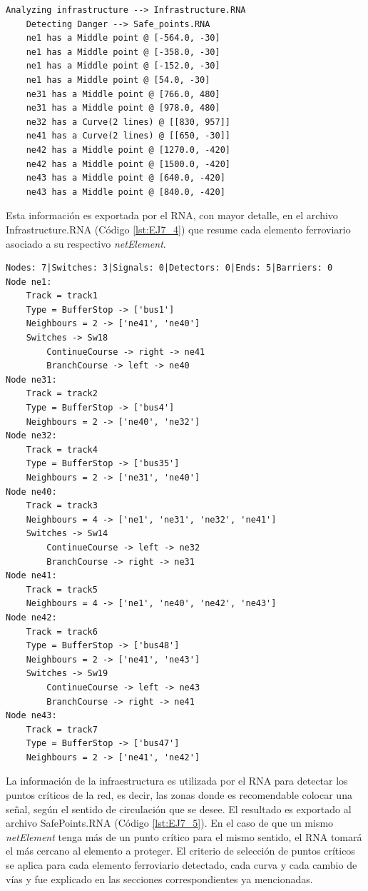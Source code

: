 	\begin{lstlisting}[language = {}, caption = Detección de puntos críticos por parte del RNA , label = {lst:EJ7_2}]
	Analyzing infrastructure --> Infrastructure.RNA
	Detecting Danger --> Safe_points.RNA
	ne1 has a Middle point @ [-564.0, -30]
	ne1 has a Middle point @ [-358.0, -30]
	ne1 has a Middle point @ [-152.0, -30]
	ne1 has a Middle point @ [54.0, -30]
	ne31 has a Middle point @ [766.0, 480]
	ne31 has a Middle point @ [978.0, 480]
	ne32 has a Curve(2 lines) @ [[830, 957]]
	ne41 has a Curve(2 lines) @ [[650, -30]]
	ne42 has a Middle point @ [1270.0, -420]
	ne42 has a Middle point @ [1500.0, -420]
	ne43 has a Middle point @ [640.0, -420]
	ne43 has a Middle point @ [840.0, -420]
	\end{lstlisting}
	
	Esta información es exportada por el RNA, con mayor detalle, en el archivo Infrastructure.RNA (Código \ref{lst:EJ7_4}) que resume cada elemento ferroviario asociado a su respectivo \textit{netElement}.
	
	\begin{lstlisting}[language = {}, caption = Infrastructure.RNA, label = {lst:EJ1_4}]
Nodes: 7|Switches: 3|Signals: 0|Detectors: 0|Ends: 5|Barriers: 0
Node ne1:
	Track = track1
	Type = BufferStop -> ['bus1']
	Neighbours = 2 -> ['ne41', 'ne40']
	Switches -> Sw18
		ContinueCourse -> right -> ne41
		BranchCourse -> left -> ne40
Node ne31:
	Track = track2
	Type = BufferStop -> ['bus4']
	Neighbours = 2 -> ['ne40', 'ne32']
Node ne32:
	Track = track4
	Type = BufferStop -> ['bus35']
	Neighbours = 2 -> ['ne31', 'ne40']
Node ne40:
	Track = track3
	Neighbours = 4 -> ['ne1', 'ne31', 'ne32', 'ne41']
	Switches -> Sw14
		ContinueCourse -> left -> ne32
		BranchCourse -> right -> ne31
Node ne41:
	Track = track5
	Neighbours = 4 -> ['ne1', 'ne40', 'ne42', 'ne43']
Node ne42:
	Track = track6
	Type = BufferStop -> ['bus48']
	Neighbours = 2 -> ['ne41', 'ne43']
	Switches -> Sw19
		ContinueCourse -> left -> ne43
		BranchCourse -> right -> ne41
Node ne43:
	Track = track7
	Type = BufferStop -> ['bus47']
	Neighbours = 2 -> ['ne41', 'ne42']
	\end{lstlisting}
	
	La información de la infraestructura es utilizada por el RNA para detectar los puntos críticos de la red, es decir, las zonas donde es recomendable colocar una señal, según el sentido de circulación que se desee. El resultado es exportado al archivo SafePoints.RNA (Código \ref{lst:EJ7_5}). En el caso de que un mismo \textit{netElement} tenga más de un punto crítico para el mismo sentido, el RNA tomará el más cercano al elemento a proteger. El criterio de selección de puntos críticos se aplica para cada elemento ferroviario detectado, cada curva y cada cambio de vías y fue explicado en las secciones correspondientes ya mencionadas.
	
